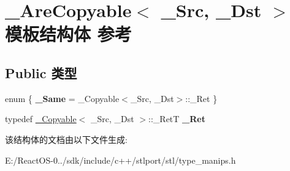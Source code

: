 \hypertarget{struct___are_copyable}{}\section{\+\_\+\+Are\+Copyable$<$ \+\_\+\+Src, \+\_\+\+Dst $>$ 模板结构体 参考}
\label{struct___are_copyable}
\subsection*{Public 类型}
\begin{DoxyCompactItemize}
\item 
\mbox{\label{struct___are_copyable_a23d16e54ddd494765e2bb4d180f2fbb4}} 
enum \{ {\bfseries \+\_\+\+Same} = \+\_\+\+Copyable$<$\+\_\+\+Src, \+\_\+\+Dst$>$\+:\+:\+\_\+\+Ret
 \}
\item 
\mbox{\label{struct___are_copyable_a9cc3c27acb3c68a76874112139dc65ec}} 
typedef \hyperlink{struct___copyable}{\+\_\+\+Copyable}$<$ \+\_\+\+Src, \+\_\+\+Dst $>$\+::\+\_\+\+RetT {\bfseries \+\_\+\+Ret}
\end{DoxyCompactItemize}


该结构体的文档由以下文件生成\+:\begin{DoxyCompactItemize}
\item 
E\+:/\+React\+O\+S-\/0../sdk/include/c++/stlport/stl/type\+\_\+manips.\+h\end{DoxyCompactItemize}
